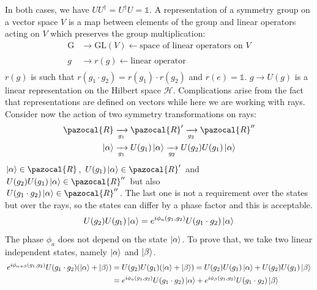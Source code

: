 \documentclass[../main.tex]{subfiles}
\begin{document}
In both cases, we have $UU^\dagger=U^\dagger U=\mathbb{1}$. A representation of a symmetry group on a vector space $V$ is a map between elements of the group and linear operators acting on $V$ which preserves the group multiplication:
\begin{align*}
    \text{G}&\to\text{GL}(V)\xleftarrow[]{}\text{space of linear operators on $V$}\\
    g&\to r(g)\xleftarrow[]{}\text{linear operator}
\end{align*}
$r(g)$ is such that $r(g_1\cdot g_2)=r(g_1)\cdot r(g_2)$ and $r(e)=\mathbb{1}$. $g\to U(g)$ is a linear representation on the Hilbert space $\mathcal{H}$. Complications arise from the fact that representations are defined on vectors while here we are working with rays. Consider now the action of two symmetry transformations on rays:
\begin{align*}
\pazocal{R}&\xrightarrow[g_1]{}\pazocal{R}'\xrightarrow[g_2]{}\pazocal{R}''\\
\ket{\alpha}&\xrightarrow[g_1]{}U(g_1)\ket{\alpha}\xrightarrow[g_2]{}U(g_2)U(g_1)\ket{\alpha}
\end{align*}
$\ket{\alpha}\in\pazocal{R}$, $U(g_1)\ket{\alpha}\in\pazocal{R}'$ and $U(g_2)U(g_1)\ket{\alpha}\in\pazocal{R}''$ but also\\
$U(g_1\cdot g_2)\ket{\alpha}\in\pazocal{R}''$. The last one is not a requirement over the states but over the rays, so the states can differ by a phase factor and this is acceptable. 
\[
U(g_2)U(g_1)\ket{\alpha}=e^{i\phi_a(g_1,g_2)}U(g_1\cdot g_2)\ket{\alpha}
\]
The phase $\phi_a$ does not depend on the state $\ket{\alpha}$. To prove that, we take two linear independent states, namely $\ket{\alpha}$ and $\ket{\beta}$.
\begin{align*}
e^{i\phi_{\alpha+\beta}(g_1,g_2)}U(g_1\cdot g_2)(\ket{\alpha}+\ket{\beta})&=U(g_2)U(g_1)(\ket{\alpha}+\ket{\beta})=U(g_2)U(g_1)\ket{\alpha}+U(g_2)U(g_1)\ket{\beta}\\
&=e^{i\phi_a(g_1,g_2)}U(g_1\cdot g_2)\ket{\alpha}+e^{i\phi_\beta(g_1,g_2)}U(g_1\cdot g_2)\ket{\beta}
\end{align*}
\end{document}
